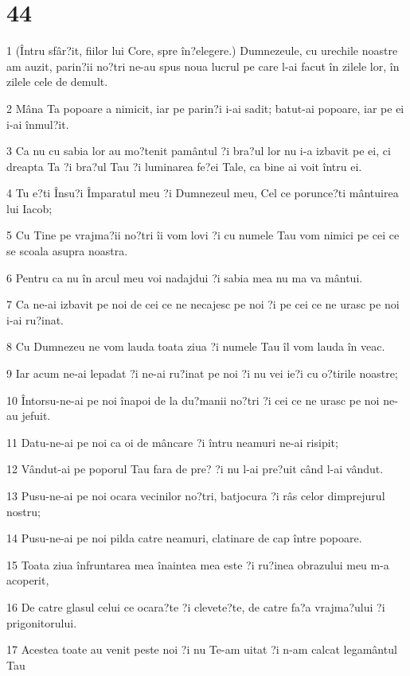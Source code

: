 \chapter{44}

\par 1 (Întru sfâr?it, fiilor lui Core, spre în?elegere.) Dumnezeule, cu urechile noastre am auzit, parin?ii no?tri ne-au spus noua lucrul pe care l-ai facut în zilele lor, în zilele cele de demult.
\par 2 Mâna Ta popoare a nimicit, iar pe parin?i i-ai sadit; batut-ai popoare, iar pe ei i-ai înmul?it.
\par 3 Ca nu cu sabia lor au mo?tenit pamântul ?i bra?ul lor nu i-a izbavit pe ei, ci dreapta Ta ?i bra?ul Tau ?i luminarea fe?ei Tale, ca bine ai voit întru ei.
\par 4 Tu e?ti Însu?i Împaratul meu ?i Dumnezeul meu, Cel ce porunce?ti mântuirea lui Iacob;
\par 5 Cu Tine pe vrajma?ii no?tri îi vom lovi ?i cu numele Tau vom nimici pe cei ce se scoala asupra noastra.
\par 6 Pentru ca nu în arcul meu voi nadajdui ?i sabia mea nu ma va mântui.
\par 7 Ca ne-ai izbavit pe noi de cei ce ne necajesc pe noi ?i pe cei ce ne urasc pe noi i-ai ru?inat.
\par 8 Cu Dumnezeu ne vom lauda toata ziua ?i numele Tau îl vom lauda în veac.
\par 9 Iar acum ne-ai lepadat ?i ne-ai ru?inat pe noi ?i nu vei ie?i cu o?tirile noastre;
\par 10 Întorsu-ne-ai pe noi înapoi de la du?manii no?tri ?i cei ce ne urasc pe noi ne-au jefuit.
\par 11 Datu-ne-ai pe noi ca oi de mâncare ?i întru neamuri ne-ai risipit;
\par 12 Vândut-ai pe poporul Tau fara de pre? ?i nu l-ai pre?uit când l-ai vândut.
\par 13 Pusu-ne-ai pe noi ocara vecinilor no?tri, batjocura ?i râs celor dimprejurul nostru;
\par 14 Pusu-ne-ai pe noi pilda catre neamuri, clatinare de cap între popoare.
\par 15 Toata ziua înfruntarea mea înaintea mea este ?i ru?inea obrazului meu m-a acoperit,
\par 16 De catre glasul celui ce ocara?te ?i clevete?te, de catre fa?a vrajma?ului ?i prigonitorului.
\par 17 Acestea toate au venit peste noi ?i nu Te-am uitat ?i n-am calcat legamântul Tau
